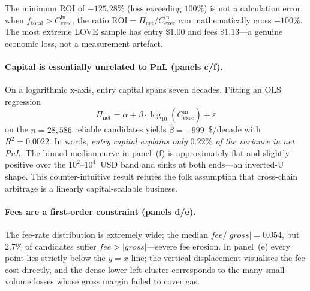 \documentclass[sigconf,nonacm,10pt]{acmart}
\newcommand{\Cexec}{C_{\text{exec}}}
\newcommand{\Pnet}{\Pi_{\text{net}}}
\begin{document}
The minimum ROI of $-125.28\%$ (loss exceeding $100\%$) is not a
calculation error: when $f_{\text{total}}>\Cexec^{\text{in}}$, the
ratio $\text{ROI}=\Pnet/\Cexec^{\text{in}}$ can mathematically cross
$-100\%$. The most extreme LOVE sample has entry $\$1.00$ and fees
$\$1.13$---a genuine economic loss, not a measurement artefact.

\paragraph{Capital is essentially unrelated to PnL (panels c/f).} On
a logarithmic x-axis, entry capital spans seven decades. Fitting an
OLS regression
\begin{equation}
  \Pnet = \alpha + \beta\cdot\log_{10}(\Cexec^{\text{in}}) + \varepsilon
  \label{eq:ols}
\end{equation}
on the $n=28{,}586$ reliable candidates yields
$\hat\beta=-999$~\$/decade with $R^2=0.0022$.
In words, \emph{entry capital explains only $0.22\%$ of the variance
in net PnL}. The binned-median curve in panel~(f) is approximately
flat and slightly positive over the $10^{2}$--$10^{4}$~USD band and
sinks at both ends---an inverted-U shape. This counter-intuitive
result refutes the folk assumption that cross-chain arbitrage is a
linearly capital-scalable business.

\paragraph{Fees are a first-order constraint (panels d/e).} The
fee-rate distribution is extremely wide; the median
$\mathit{fee}/|\mathit{gross}|=0.054$, but $2.7\%$ of candidates
suffer $\mathit{fee}>|\mathit{gross}|$---severe fee erosion. In
panel~(e) every point lies strictly below the $y=x$ line; the
vertical displacement visualises the fee cost directly, and the dense
lower-left cluster corresponds to the many small-volume losses whose
gross margin failed to cover gas.
\end{document}
